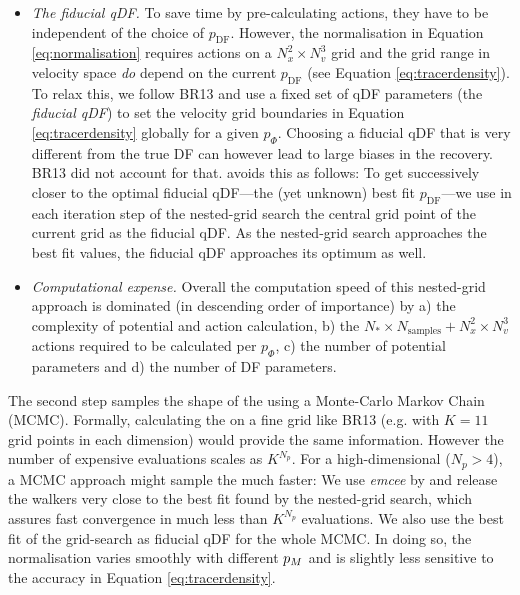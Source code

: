 \begin{itemize}
\item \emph{The fiducial qDF.} To save time by pre-calculating actions, they have to be independent of the choice of $p_\text{DF}$. However, the normalisation in Equation \ref{eq:normalisation} requires actions on a $N_x^2 \times N_v^3$ grid and the grid range in velocity space \emph{do} depend on the current $p_\text{DF}$ (see Equation \ref{eq:tracerdensity}). To relax this, we follow BR13 and use a fixed set of qDF parameters (the \emph{fiducial qDF}) to set the velocity grid boundaries in Equation \ref{eq:tracerdensity} globally for a given $p_\Phi$. Choosing a fiducial qDF that is very different from the true DF can however lead to large biases in the \pmodel{} recovery. BR13 did not account for that. \RM{} avoids this as follows: To get successively closer to the optimal fiducial qDF---the (yet unknown) best fit $p_\text{DF}$---we use in each iteration step of the nested-grid search the central grid point of the current \pmodel{} grid as the fiducial qDF.  As the nested-grid search approaches the best fit values, the fiducial qDF approaches its optimum as well. 

\item \emph{Computational expense.} Overall the computation speed of this nested-grid approach is dominated (in descending order of importance) by a) the complexity of potential and action calculation, b) the $N_* \times N_\text{samples} + N_x^2 \times N_v^3$ actions required to be calculated per $p_\Phi$, c) the number of potential parameters and d) the number of DF parameters.
\end{itemize}

The second step samples the shape of the \pdf{} using a Monte-Carlo Markov Chain (MCMC). Formally, calculating the \pdf{} on a fine grid like BR13 (e.g. with $K=11$ grid points in each dimension) would provide the same information. However the number of expensive \pdf{} evaluations scales as $K^{N_p}$. For a high-dimensional \pmodel{} ($N_p>4$), a MCMC approach might sample the \pdf{} much faster: We use \emph{emcee} by \citet{2013PASP..125..306F} and release the walkers very close to the best fit \pmodel{} found by the nested-grid search, which assures fast convergence in much less than $K^{N_p}$ \pdf{} evaluations. We also use the best fit \pmodel{} of the grid-search as fiducial qDF for the whole MCMC. In doing so, the normalisation varies smoothly with different $p_M{}$ and is slightly less sensitive to the accuracy in Equation \ref{eq:tracerdensity}.